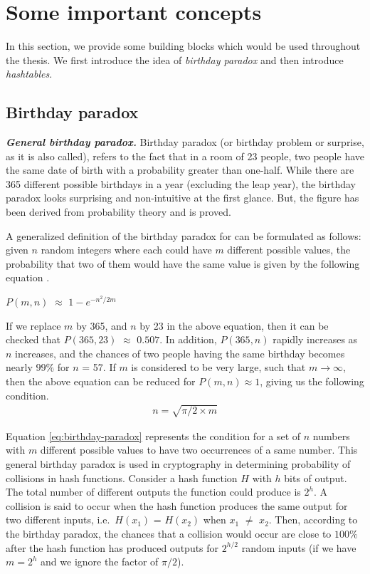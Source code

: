 \section{Some important concepts}

In this section, we provide some building blocks which would be used throughout the thesis. We first introduce the idea of \textit{birthday paradox} and then introduce \textit{hashtables}.

\subsection{Birthday paradox}
\label{sec:bday-paradox}

\indent \textit{\textbf{General birthday paradox.}} Birthday paradox (or birthday problem or surprise, as it is also called), refers to the fact that in a room of 23 people, two people have the same date of birth with a probability greater than one-half. While there are 365 different possible birthdays in a year (excluding the leap year), the birthday paradox looks surprising and non-intuitive at the first glance. But, the figure has been derived from probability theory and is proved. 

A generalized definition of the birthday paradox for can be formulated as follows: given $n$ random integers where each could have $m$ different possible values, the probability that two of them would have the same value is given by the following equation \cite{menezes}.
\begin{center}
$P(m,n)$ $\approx$ $1 - e^{-{n^2}/{2m}}$
\end{center}
If we replace $m$ by 365, and $n$ by 23 in the above equation, then it can be checked that $P(365,23)$ $\approx$ $0.507$. In addition, $P(365,n)$ rapidly increases as $n$ increases, and the chances of two people having the same birthday becomes nearly $99 \%$ for $n$ = 57. If $m$ is considered to be very large, such that $m \rightarrow \infty$, then the above equation can be reduced for $P(m,n) \approx 1$, giving us the following condition. 
\begin{align}
\label{eq:birthday-paradox} n = \sqrt{\pi/2 \times m}
\end{align}

Equation \ref{eq:birthday-paradox} represents the condition for a set of $n$ numbers with $m$ different possible values to have two occurrences of a same number. This general birthday paradox is used in cryptography in determining probability of collisions in hash functions. Consider a hash function $H$ with $h$ bits of output. The total number of different outputs the function could produce is $2^{h}$. A collision is said to occur when the hash function produces the same output for two different inputs, i.e.~$H(x_1)$ = $H(x_2)$ when $x_1$ $\neq$ $x_2$. Then, according to the birthday paradox, the chances that a collision would occur are close to $100 \%$ after the hash function has produced outputs for $2^{h/2}$ random inputs (if we have $m = 2^h$ and we ignore the factor of $\pi/2$).\\

